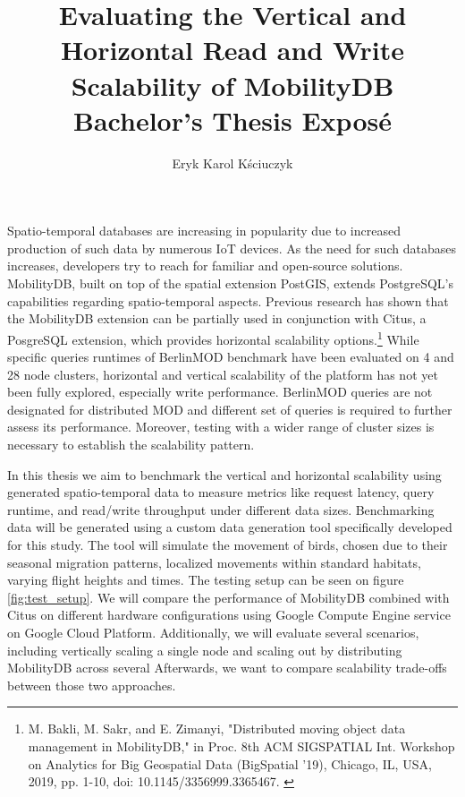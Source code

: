 \documentclass{article}
\title{
	Evaluating the Vertical and Horizontal Read and Write Scalability of 
	MobilityDB
	\\[1ex] \large Bachelor's Thesis Exposé}
\author{Eryk Karol Kściuczyk}
\date{} %
\begin{document}
\maketitle

\vspace*{-0.3cm}

Spatio-temporal databases are increasing in popularity due to increased
production of such data by numerous IoT devices.
As the need for such databases increases, developers try to reach for 
familiar  and open-source solutions.
MobilityDB, built on top of the spatial extension PostGIS, extends PostgreSQL's 
capabilities regarding spatio-temporal aspects.
Previous research has shown that the MobilityDB extension can be partially used
in conjunction with Citus, a PosgreSQL extension, which provides horizontal
scalability options.\footnote{
M. Bakli, M. Sakr, and E. Zimanyi,
"Distributed moving object data management in MobilityDB,"
in Proc. 8th ACM SIGSPATIAL Int. Workshop on Analytics for Big Geospatial Data
(BigSpatial '19), Chicago, IL, USA, 2019,
pp. 1-10, doi: 10.1145/3356999.3365467.
\label{footnote:mobilitydb}
}
While specific queries runtimes of BerlinMOD benchmark have been 
evaluated on 4 and 28 node clusters,
horizontal and vertical scalability of the platform has not yet been fully
explored, especially write performance.
BerlinMOD queries are not designated for distributed MOD and different set of
queries is required to further assess its performance.
Moreover, testing with a wider range of cluster sizes is necessary to 
establish the scalability pattern.

In this thesis we aim to benchmark the vertical and horizontal scalability
using generated spatio-temporal data to measure metrics like request 
latency, query runtime, and read/write throughput under different data sizes.
Benchmarking data will be generated using a custom data generation tool
specifically developed for this study.
The tool will simulate the movement of birds, chosen due to their
seasonal migration patterns, localized movements within standard habitats,
varying flight heights and times. The testing setup can be seen on figure
\ref{fig:test_setup}.
%
We will compare the performance of MobilityDB combined with Citus on different
hardware configurations using Google Compute Engine service on Google Cloud
Platform.
Additionally, we will evaluate several scenarios, including vertically scaling 
a single node and scaling out by distributing MobilityDB across several 
Afterwards, we want to compare scalability trade-offs between those two
approaches.
\end{document}
